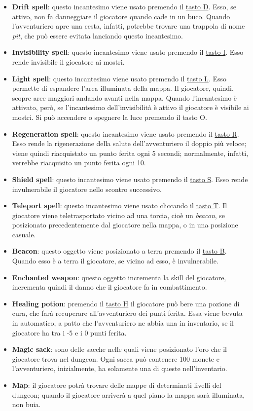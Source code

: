 \documentclass{report}
\begin{document}
\begin{itemize}
    \item \textbf{Drift spell}: questo incantesimo viene usato premendo il \underline{tasto D}. Esso, se attivo, non fa danneggiare il giocatore quando cade in un buco. Quando l'avventuriero apre una cesta, infatti, potrebbe trovare una trappola di nome \textit{pit}, che può essere evitata lanciando questo incantesimo.
    \item \textbf{Invisibility spell}: questo incantesimo viene usato premendo il \underline{tasto I}. Esso rende invisibile il giocatore ai mostri. 
    \item \textbf{Light spell}: questo incantesimo viene usato premendo il \underline{tasto L}. Esso permette di espandere l’area illuminata della mappa. Il giocatore, quindi, scopre aree maggiori andando avanti nella mappa. Quando l’incantesimo è attivato, però, se l’incantesimo dell'invisibilità è attivo il giocatore è visibile ai mostri. Si può accendere o spegnere la luce premendo il tasto O.
    \item \textbf{Regeneration spell}: questo incantesimo viene usato premendo il \underline{tasto R}. Esso rende la rigenerazione della salute dell’avventuriero il doppio più veloce; viene quindi riacquistato un punto ferita ogni 5 secondi; normalmente, infatti, verrebbe riacquisito un punto ferita ogni 10.
    \item \textbf{Shield spell}: questo incantesimo viene usato premendo il \underline{tasto S}. Esso rende invulnerabile il giocatore nello scontro successivo.
    \item \textbf{Teleport spell}: questo incantesimo viene usato cliccando il \underline{tasto T}. Il giocatore viene teletrasportato vicino ad una torcia, cioè un \textit{beacon}, se posizionato precedentemente dal giocatore nella mappa, o in una posizione casuale.
    \item \textbf{Beacon}: questo oggetto viene posizionato a terra premendo il \underline{tasto B}. Quando esso è a terra il giocatore, se vicino ad esso, è invulnerabile.
    \item \textbf{Enchanted weapon}: questo oggetto incrementa la skill del giocatore, incrementa quindi il danno che il giocatore fa in combattimento.
    \item \textbf{Healing potion}: premendo il \underline{tasto H} il giocatore può bere una pozione di cura, che farà recuperare all’avventuriero dei punti ferita. Essa viene bevuta in automatico, a patto che l'avventuriero ne abbia una in inventario, se il giocatore ha tra i -5 e i 0 punti ferita.
    \item \textbf{Magic sack}: sono delle sacche nelle quali viene posizionato l’oro che il giocatore trova nel dungeon. Ogni sacca può contenere 100 monete e l’avventuriero, inizialmente, ha solamente una di queste nell’inventario.
    \item \textbf{Map}: il giocatore potrà trovare delle mappe di determinati livelli del dungeon; quando il giocatore arriverà a quel piano la mappa sarà illuminata, non buia.
\end{itemize}
\end{document}
